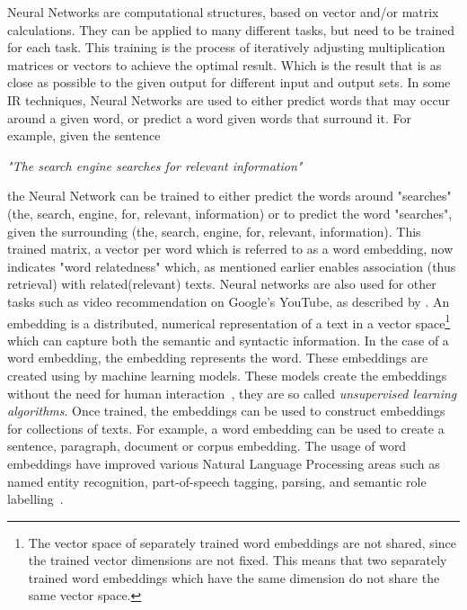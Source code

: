 \documentclass[../../Thesis.tex]{subfiles}
\begin{document}
Neural Networks are computational structures, based on vector and/or matrix calculations. They can be applied to many different tasks, but need to be trained for each task. This training is the process of iteratively adjusting multiplication matrices or vectors to achieve the optimal result. Which is the result that is as close as possible to the given output for different input and output sets.
In some IR techniques, Neural Networks are used to either predict words that may occur around a given word, or predict a word given words that surround it. For example, given the sentence\\
\begin{center}
\textit{"The search engine searches for relevant information"}
\end{center}
the Neural Network can be trained to either predict the words around "searches" (the, search, engine, for, relevant, information) or to predict the word "searches", given the surrounding (the, search, engine, for, relevant, information). This trained matrix, a vector per word which is referred to as a word embedding, now indicates "word relatedness" which, as mentioned earlier enables association (thus retrieval) with related(relevant) texts. Neural networks are also used for other tasks such as video recommendation on Google's YouTube, as described by \citet{covington2016deep}.
An embedding is a distributed, numerical representation of a text in a vector space\footnote{The vector space of separately trained word embeddings are not shared, since the trained vector dimensions are not fixed. This means that two separately trained word embeddings which have the same dimension do not share the same vector space.} which can capture both the semantic and syntactic information\cite{mikolov2013distributed}. In the case of a word embedding, the embedding represents the word. These embeddings are created using by machine learning models. These models create the embeddings without the need for human interaction~\cite{lai2016generate}, they are so called \textit{unsupervised learning algorithms}. Once trained, the embeddings can be used to construct embeddings for collections of texts. For example, a word embedding can be used to create a sentence, paragraph, document or corpus embedding. The usage of word embeddings have improved various Natural Language Processing areas such as named entity recognition, part-of-speech tagging, parsing, and semantic role labelling~\citet{luong2013better}.
\end{document}
